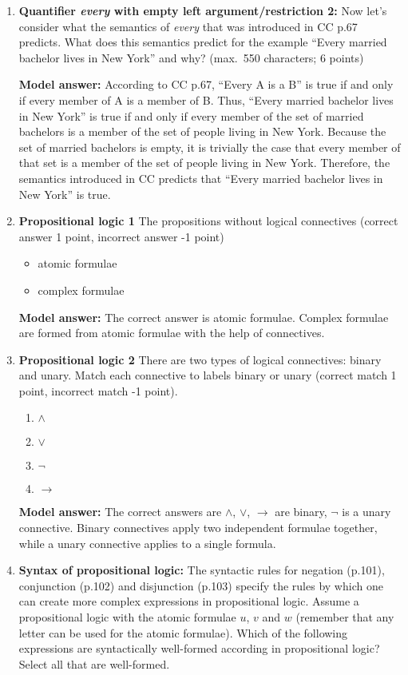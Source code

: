 \documentclass[a4,11pt]{article}
\newcommand{\6}{\mbox{$[\hspace*{-.6mm}[$}}
\newcommand{\9}{\mbox{$]\hspace*{-.6mm}]$}}
\begin{document}
\begin{enumerate}[leftmargin = 12pt]
\item {\bf Quantifier {\em every} with empty left argument/restriction 2:} Now let's consider what the semantics of {\em every} that was introduced in CC p.67 predicts. What does this semantics predict for the example ``Every married bachelor lives in New York'' and why? (max.\ 550 characters; 6 points)

{\bf Model answer:} According to CC p.67, ``Every A is a B'' is true if and only if every member of A is a member of B. Thus, ``Every married bachelor lives in New York'' is true if and only if every member of the set of married bachelors is a member of the set of people living in New York. Because the set of married bachelors is empty, it is trivially the case that every member of that set is a member of the set of people living in New York. Therefore, the semantics introduced in CC predicts that ``Every married bachelor lives in New York''  is true.

\item {\bf Propositional logic 1}
The propositions without logical connectives (correct answer 1 point, incorrect answer -1 point)

\begin{itemize}[noitemsep]
\item atomic formulae
\item complex formulae
\end{itemize}

{\bf Model answer:} The correct answer is atomic formulae. Complex formulae are formed from atomic formulae with the help of connectives.

\item {\bf Propositional logic 2}
There are two types of logical connectives: binary and unary. Match each connective to labels binary or unary (correct match 1 point, incorrect match -1 point).

\begin{enumerate}[noitemsep]
\item $\land$
\item $\lor$
\item $\neg$
\item $\rightarrow$
\end{enumerate}

{\bf Model answer:} The correct answers are $\land$, $\lor$, $\rightarrow$ are binary, $\neg$ is a unary connective. Binary connectives apply two independent formulae together, while a unary connective applies to a single formula.

\item {\bf Syntax of propositional logic:} The syntactic rules for negation (p.101), conjunction (p.102) and disjunction (p.103) specify the rules by which one can create more complex expressions in propositional logic. Assume a propositional logic with the atomic formulae $u$, $v$ and $w$ (remember that any letter can be used for the atomic formulae). Which of the following expressions are syntactically well-formed according in propositional logic? Select all that are well-formed.


\end{enumerate}
\end{document}
